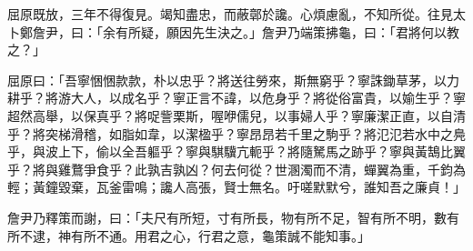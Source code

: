 
\begin{pinyinscope}
屈原既放，三年不得復見。竭知盡忠，而蔽鄣於讒。心煩慮亂，不知所從。往見太卜鄭詹尹，曰：「余有所疑，願因先生決之。」詹尹乃端策拂龜，曰：「君將何以教之？」

屈原曰：「吾寧悃悃款款，朴以忠乎？將送往勞來，斯無窮乎？寧誅鋤草茅，以力耕乎？將游大人，以成名乎？寧正言不諱，以危身乎？將從俗富貴，以媮生乎？寧超然高舉，以保真乎？將哫訾栗斯，喔咿儒兒，以事婦人乎？寧廉潔正直，以自清乎？將突梯滑稽，如脂如韋，以潔楹乎？寧昂昂若千里之駒乎？將氾氾若水中之鳧乎，與波上下，偷以全吾軀乎？寧與騏驥亢軛乎？將隨駑馬之跡乎？寧與黃鵠比翼乎？將與雞鶩爭食乎？此孰吉孰凶？何去何從？世溷濁而不清，蟬翼為重，千鈞為輕；黃鐘毀棄，瓦釜雷鳴；讒人高張，賢士無名。吁嗟默默兮，誰知吾之廉貞！」

詹尹乃釋策而謝，曰：「夫尺有所短，寸有所長，物有所不足，智有所不明，數有所不逮，神有所不通。用君之心，行君之意，龜策誠不能知事。」


\end{pinyinscope}